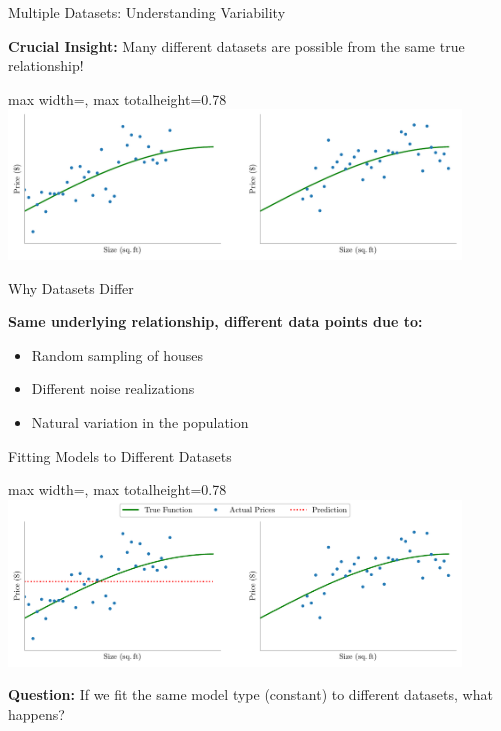 \documentclass[10pt]{beamer}
\newcommand{\fitpic}[1]{\begin{adjustbox}{max width=\linewidth, max totalheight=0.78\textheight}#1\end{adjustbox}}
\begin{document}
\begin{frame}{Multiple Datasets: Understanding Variability}
\footnotesize
\begin{keypointsbox}
\raggedright
\textbf{Crucial Insight:} Many different datasets are possible from the same true relationship!
\end{keypointsbox}

\begin{center}
\fitpic{\includegraphics[width=0.9\textwidth]{../assets/bias-variance/figures/bias1_latexify.pdf}}
\end{center}
\end{frame}

\begin{frame}{Why Datasets Differ}
\footnotesize
\begin{examplebox}
\raggedright
\textbf{Same underlying relationship, different data points due to:}
\begin{itemize}
\item Random sampling of houses
\item Different noise realizations
\item Natural variation in the population
\end{itemize}
\end{examplebox}
\end{frame}

\begin{frame}{Fitting Models to Different Datasets}
\begin{center}
\fitpic{\includegraphics[width=0.9\textwidth]{../assets/bias-variance/figures/bias2_latexify.pdf}}
\end{center}

\begin{keypointsbox}
\raggedright
\textbf{Question:} If we fit the same model type (constant) to different datasets, what happens?
\end{keypointsbox}
\end{frame}
\end{document}
